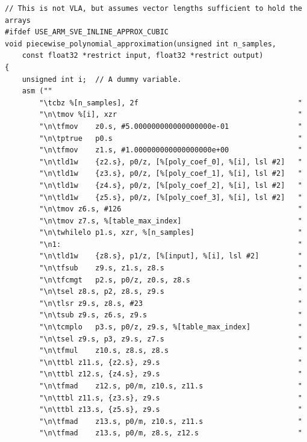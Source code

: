 \documentclass[11pt,a4paper,twoside,english]{extarticle}
\begin{document}
\begin{lstfloat}[H]
\begin{lstlisting}[style=C, captionpos=b, caption={Piecewise polynomial approximation implementations using \arm SVE inline assembly.}, label={code:c:piecewise_polynomial_approximation_use_arm_sve_inline_approx_cubic}]
// This is not VLA, but assumes vector lengths sufficient to hold the arrays
#ifdef USE_ARM_SVE_INLINE_APPROX_CUBIC
void piecewise_polynomial_approximation(unsigned int n_samples, 
    const float32 *restrict input, float32 *restrict output)
{
    unsigned int i;  // A dummy variable.
    asm (""
        "\tcbz %[n_samples], 2f                                     "  
        "\n\tmov %[i], xzr                                          "
        "\n\tfmov    z0.s, #5.000000000000000000e-01                "
        "\n\tptrue   p0.s                                           "
        "\n\tfmov    z1.s, #1.000000000000000000e+00                "
        "\n\tld1w    {z2.s}, p0/z, [%[poly_coef_0], %[i], lsl #2]   "
        "\n\tld1w    {z3.s}, p0/z, [%[poly_coef_1], %[i], lsl #2]   "
        "\n\tld1w    {z4.s}, p0/z, [%[poly_coef_2], %[i], lsl #2]   "
        "\n\tld1w    {z5.s}, p0/z, [%[poly_coef_3], %[i], lsl #2]   "
        "\n\tmov z6.s, #126                                         "
        "\n\tmov z7.s, %[table_max_index]                           "
        "\n\twhilelo p1.s, xzr, %[n_samples]                        "
        "\n1:                                                       "
        "\n\tld1w    {z8.s}, p1/z, [%[input], %[i], lsl #2]         "
        "\n\tfsub    z9.s, z1.s, z8.s                               "
        "\n\tfcmgt   p2.s, p0/z, z0.s, z8.s                         "
        "\n\tsel z8.s, p2, z8.s, z9.s                               "
        "\n\tlsr z9.s, z8.s, #23                                    "
        "\n\tsub z9.s, z6.s, z9.s                                   "
        "\n\tcmplo   p3.s, p0/z, z9.s, %[table_max_index]           "
        "\n\tsel z9.s, p3, z9.s, z7.s                               "
        "\n\tfmul    z10.s, z8.s, z8.s                              "
        "\n\ttbl z11.s, {z2.s}, z9.s                                "
        "\n\ttbl z12.s, {z4.s}, z9.s                                "
        "\n\tfmad    z12.s, p0/m, z10.s, z11.s                      "
        "\n\ttbl z11.s, {z3.s}, z9.s                                "
        "\n\ttbl z13.s, {z5.s}, z9.s                                "
        "\n\tfmad    z13.s, p0/m, z10.s, z11.s                      "
        "\n\tfmad    z13.s, p0/m, z8.s, z12.s                       "

\end{lstlisting}
\end{lstfloat}
\end{document}
